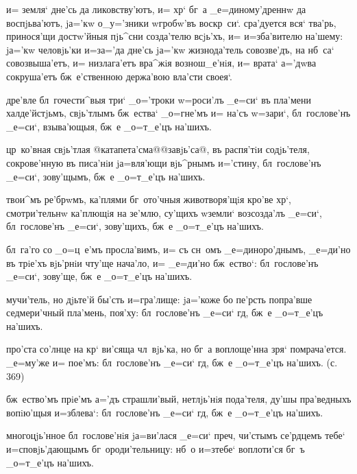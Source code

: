 {{  и= земля` дне'сь да ликовству'ютъ, 
и= хр` бг~а _е=диному'дреннw да воспjьва'ютъ, jа='кw 
о_у='зники w\т гробw'въ воскр~си`. сра'дуется вся` 
тва'рь, принося'щи достw'йныя пjь^сни созда'телю всjь'хъ, 
и= и=зба'вителю на'шему: jа='кw человjь'ки и=з\ъ а='да 
дне'сь jа='кw жизнода'тель совозве'дъ, на нб~са` 
совозвыша'етъ, и= низлага'етъ вра^жiя вознош_е'нiя, и= 
врата` а='дwва сокруша'етъ бж~е'ственною держа'вою 
вла'сти своея`.


  дре'вле бл~гочести^выя три` 
_о='троки w=роси'лъ _е=си` въ пла'мени халде'йстjьмъ, 
свjь'тлымъ бж~ества` _о=гне'мъ и= на'съ w=зари`, 
бл~гослове'нъ _е=си`, взыва'ющыя, бж~е _о=т_е'цъ на'шихъ.

 цр~ко'вная свjь'тлая 
@катапета'сма@{@завjь'са@}, въ распя'тiи содjь'теля, 
сокрове'нную въ писа'нiи jа=вля'ющи вjь^рнымъ и='стину, 
бл~гослове'нъ _е=си`, зову'щымъ, бж~е _о=т_е'цъ на'шихъ.

 твои^мъ ре'брwмъ, ка'плями 
бг~ото'чныя животворя'щiя кро'ве хр`, смотри'тельнw 
ка'плющiя на зе'млю, су'щихъ w\т земли` возсозда'лъ 
_е=си`, бл~гослове'нъ _е=си`, зову'щихъ, бж~е _о=т_е'цъ 
на'шихъ.

  бл~га'го со _о=ц~е'мъ просла'вимъ, 
и= съ сн~омъ _е=диноро'днымъ, _е=ди'но въ трiе'хъ 
вjь'рнiи чту'ще нача'ло, и= _е=ди'но бж~ество`: 
бл~гослове'нъ _е=си`, зову'ще, бж~е _о=т_е'цъ на'шихъ.


 мучи'тель, но дjьте'й бы'сть 
и=гра'лище: jа='коже бо пе'рсть попра'вше седмери'чный 
пла'мень, поя'ху: бл~гослове'нъ _е=си` гд, бж~е 
_о=т_е'цъ на'шихъ.

 про'ста со'лнце на кр` ви'сяща чл~вjь'ка, 
но бг~а воплоще'нна зря` помрача'ется. _е=му'же и= 
пое'мъ: бл~гослове'нъ _е=си` гд, бж~е _о=т_е'цъ 
на'шихъ. (с. 369)

 бж~ество'мъ прiе'мъ а='дъ страшли'вый, 
нетлjь'нiя пода'теля, ду'шы пра'ведныхъ вопiю'щыя 
и=зблева`: бл~гослове'нъ _е=си` гд, бж~е _о=т_е'цъ 
на'шихъ.

  многоцjь'нное 
бл~гослове'нiя jа=ви'лася _е=си` преч, чи'стымъ 
се'рдцемъ тебе` и=сповjь'дающымъ бг~ороди'тельницу: нб~о 
и=з\ъ тебе` воплоти'ся бг~ъ _о=т_е'цъ на'шихъ.

}}
